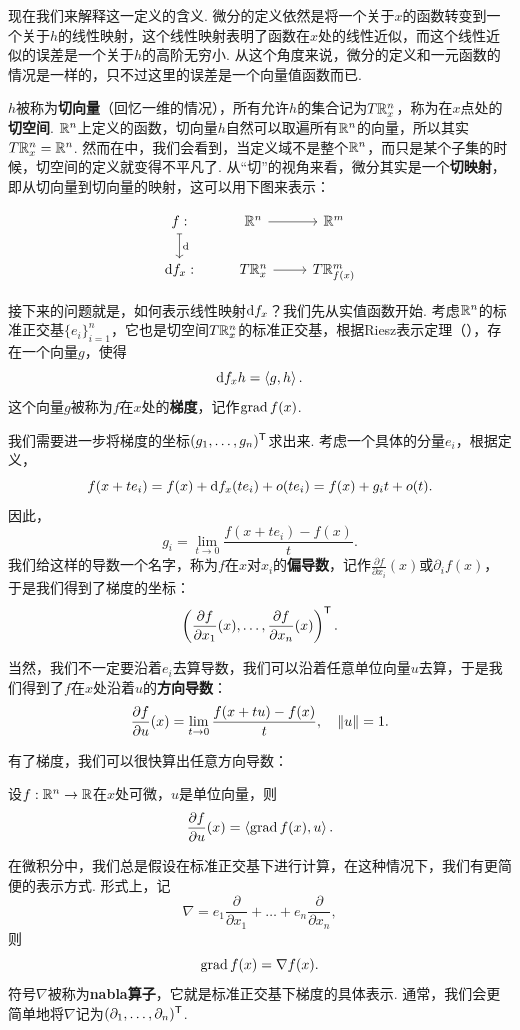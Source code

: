 现在我们来解释这一定义的含义. 微分的定义依然是将一个关于$x$的函数转变到一个关于$h$的线性映射，这个线性映射表明了函数在$x$处的线性近似，而这个线性近似的误差是一个关于$h$的高阶无穷小. 从这个角度来说，微分的定义和一元函数的情况是一样的，只不过这里的误差是一个向量值函数而已. 

$h$被称为\textbf{切向量}（回忆一维的情况），所有允许$h$的集合记为$T\mathbb{R}_x^n$，称为在$x$点处的\textbf{切空间}. $\mathbb{R}^n$上定义的函数，切向量$h$自然可以取遍所有$\mathbb{R}^n$的向量，所以其实$T\mathbb{R}_x^n=\mathbb{R}^n$. 然而在中，我们会看到，当定义域不是整个$\mathbb{R}^n$，而只是某个子集的时候，切空间的定义就变得不平凡了. 从“切”的视角来看，微分其实是一个\textbf{切映射}，即从切向量到切向量的映射，这可以用下图来表示：

\[\begin{tikzcd} f:\arrow[mapsto, d, "\d"] & \R^n\arrow[r, ""] & \R^m \\
\d f_x: & T\R^n_x \arrow[r, ""] & T\R^m_{f(x)}
\end{tikzcd}\]

接下来的问题就是，如何表示线性映射$\mathrm{d} f_x$？我们先从实值函数开始. 考虑$\mathbb{R}^n$的标准正交基$\{e_i\}_{i=1}^n$，它也是切空间$T\mathbb{R}^n_x$的标准正交基，根据Riesz表示定理（），存在一个向量$g$，使得
\[
    \mathrm{d} f_x h=\left\langle{g},{h}\right\rangle.
\]
这个向量$g$被称为$f$在$x$处的\textbf{梯度}，记作$\operatorname*{grad} f(x)$. 

我们需要进一步将梯度的坐标$(g_1,\dots,g_n)^{\mathsf{T}}$求出来. 考虑一个具体的分量$e_i$，根据定义，
\[f(x+te_i)=f(x)+\mathrm{d} f_x(te_i)+o(te_i)=f(x)+g_it+o(t).\]
因此，
\[g_i=\lim_{t\to 0}\frac{f(x+te_i)-f(x)}{t}.\]
我们给这样的导数一个名字，称为$f$在$x$对$x_i$的\textbf{偏导数}，记作$\frac{\partial f}{\partial x_i}(x)$或$\partial_i f(x)$，于是我们得到了梯度的坐标：
\[\left(\frac{\partial f}{\partial x_1}(x),\dots,\frac{\partial f}{\partial x_n}(x)\right)^{\mathsf{T}}.\]

当然，我们不一定要沿着$e_i$去算导数，我们可以沿着任意单位向量$u$去算，于是我们得到了$f$在$x$处沿着$u$的\textbf{方向导数}：
\[\frac{\partial f}{\partial u}(x)=\lim_{t\to 0}\frac{f(x+tu)-f(x)}{t},\quad\left\|u\right\|=1.\]

有了梯度，我们可以很快算出任意方向导数：

\begin{proposition}\label{proposition:directional-derivative}
    设$f:\mathbb{R}^n\to\mathbb{R}$在$x$处可微，$u$是单位向量，则
    \[\frac{\partial f}{\partial u}(x)=\left\langle{\operatorname*{grad}f(x)},{u}\right\rangle.\]
\end{proposition}

在微积分中，我们总是假设在标准正交基下进行计算，在这种情况下，我们有更简便的表示方式. 形式上，记
\[\nabla =e_1\frac{\partial }{\partial x_1}+\dots+e_n\frac{\partial }{\partial x_n},\]
则
\[\operatorname*{grad} f(x)=\nabla f(x).\]
符号$\nabla$被称为\textbf{nabla算子}，它就是标准正交基下梯度的具体表示. 通常，我们会更简单地将$\nabla $记为$(\partial_1 ,\dots,\partial_n)^{\mathsf{T}}$. 

